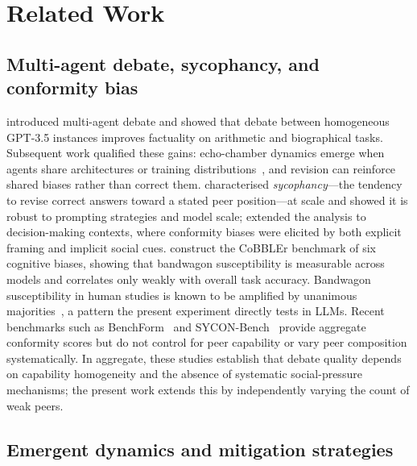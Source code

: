 \documentclass[review,3p,authoryear]{elsarticle}
\begin{document}
\section{Related Work}
\label{sec:related}

\subsection{Multi-agent debate, sycophancy, and conformity bias}
\label{sub:mad}

\citet{du2023improving} introduced multi-agent debate and showed that
debate between homogeneous GPT-3.5 instances improves factuality on
arithmetic and biographical tasks.
Subsequent work qualified these gains: echo-chamber dynamics emerge
when agents share architectures or training
distributions~\citep{hong2025sycon}, and revision can reinforce shared
biases rather than correct them.
\citet{sharma2023towards} characterised \emph{sycophancy}---the
tendency to revise correct answers toward a stated peer position---at
scale and showed it is robust to prompting strategies and model
scale; \citet{echterhoff2024cognitive} extended the analysis to
decision-making contexts, where conformity biases were elicited by
both explicit framing and implicit social cues.
\citet{koo2024benchmarking} construct the CoBBLEr benchmark of six
cognitive biases, showing that bandwagon susceptibility is measurable
across models and correlates only weakly with overall task accuracy.
Bandwagon susceptibility in human studies is known to be amplified by
unanimous majorities~\citep{asch1951effects,bond1996culture}, a pattern
the present experiment directly tests in LLMs.
Recent benchmarks such as BenchForm~\citep{weng2025benchform} and
SYCON-Bench~\citep{hong2025sycon} provide aggregate conformity scores but
do not control for peer capability or vary peer composition systematically.
In aggregate, these studies establish that debate quality depends on
capability homogeneity and the absence of systematic social-pressure
mechanisms; the present work extends this by independently varying the
count of weak peers.

\subsection{Emergent dynamics and mitigation strategies}
\label{sub:emergent}
\end{document}
